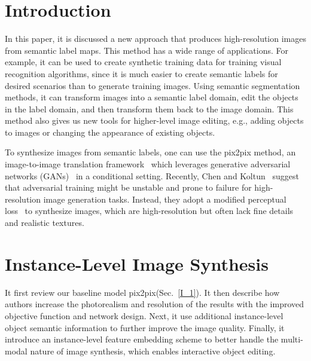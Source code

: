 \documentclass[10pt,twocolumn,letterpaper]{article}
\begin{document}
\section{Introduction}
In this paper, it is discussed a new approach that produces high-resolution images from semantic label maps. This method has a wide range of applications. For example, it can be used to create synthetic training data for training visual recognition algorithms, since it is much easier to create semantic labels for desired scenarios than to generate training images. Using semantic segmentation methods, it can transform images into a semantic label domain, edit the objects in the label domain, and then transform them back to the image domain. This method also gives us new tools for higher-level image editing, e.g., adding objects to images or changing the appearance of existing objects.\par
To synthesize images from semantic labels, one can use the pix2pix method, an image-to-image translation framework~\cite{Isola2017Image} which leverages generative adversarial networks (GANs)~\cite{Goodfellow2014Generative} in a conditional setting. Recently, Chen and Koltun~\cite{Chen2017Photographic} suggest that adversarial training might be unstable and prone to failure for high-resolution image generation tasks. Instead, they adopt a modified perceptual loss~\cite{Dosovitskiy2016Generating,Gatys2016Image,Johnson2016Perceptual} to synthesize images, which are high-resolution but often lack fine details and realistic textures.\par

\section{Instance-Level Image Synthesis}
It first review our baseline model pix2pix(Sec.~\ref{I_1}). It then describe how authors increase the photorealism and resolution of the results with the improved objective function and network design. Next, it use additional instance-level object semantic information to further improve the image quality. Finally, it introduce an instance-level feature embedding scheme to better handle the multi-modal nature of image synthesis, which enables interactive object editing.
\end{document}
